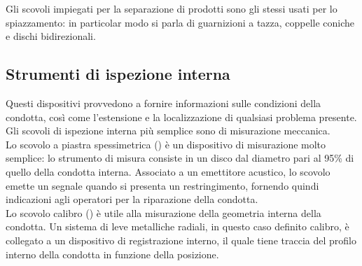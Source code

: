Gli scovoli impiegati per la separazione di prodotti sono gli stessi usati per lo spiazzamento: in particolar modo si parla di guarnizioni a tazza, coppelle coniche e dischi bidirezionali.

\subsection{Strumenti di ispezione interna}
Questi dispositivi provvedono a fornire informazioni sulle condizioni della condotta, così come l'estensione e la localizzazione di qualsiasi problema presente. Gli scovoli di ispezione interna più semplice sono di misurazione meccanica.\\
Lo scovolo a piastra spessimetrica () è un dispositivo di misurazione molto semplice: lo strumento di misura consiste in un disco dal diametro pari al 95\% di quello della condotta interna. Associato a un emettitore acustico, lo scovolo emette un segnale quando si presenta un restringimento, fornendo quindi indicazioni agli operatori per la riparazione della condotta. \\
Lo scovolo calibro () è utile alla misurazione della geometria interna della condotta. Un sistema di leve metalliche radiali, in questo caso definito calibro, è collegato a un dispositivo di registrazione interno, il quale tiene traccia del profilo interno della condotta in funzione della posizione. 


